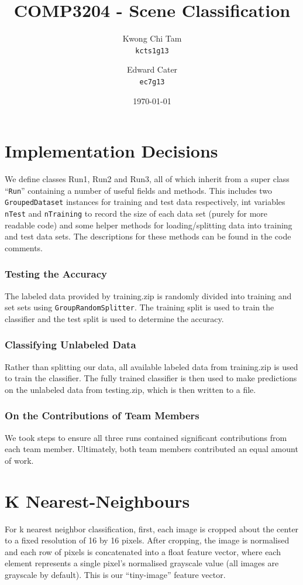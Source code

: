 \documentclass[a4paper]{article}
\title{COMP3204 - Scene Classification}
\author{
	Kwong Chi Tam\\
 	\texttt{kcts1g13}
    \and
  	Edward Cater\\
  	\texttt{ec7g13}  
}
\date{\today}
\begin{document}
\maketitle

\section*{Implementation Decisions}
We define classes Run1, Run2 and Run3, all of which inherit from a super class ``\texttt{Run}'' containing a number of useful fields and methods. This includes two  \texttt{GroupedDataset} instances for training and test data respectively, int variables \texttt{nTest} and \texttt{nTraining} to record the size of each data set (purely for more readable code) and some helper methods for loading/splitting data into training and test data sets. The descriptions for these methods can be found in the code comments.

\subsubsection*{Testing the Accuracy}
The labeled data provided by training.zip is randomly divided into training and set sets using \texttt{GroupRandomSplitter}. The training split is used to train the classifier and the test split is used to determine the accuracy.

\subsubsection*{Classifying Unlabeled Data}
Rather than splitting our data, all available labeled data from training.zip is used to train the classifier. The fully trained classifier is then used to make predictions on the unlabeled data from testing.zip, which is then written to a file.

\subsubsection*{On the Contributions of Team Members}
We took steps to ensure all three runs contained significant contributions from each team member. Ultimately, both team members contributed an equal amount of work.

\section{K Nearest-Neighbours}
For k nearest neighbor classification, first, each image is cropped about the center to a fixed resolution of 16 by 16 pixels. After cropping, the image is normalised and each row of pixels is concatenated into a float feature vector, where each element represents a single pixel’s normalised grayscale value (all images are grayscale by default). This is our “tiny-image” feature vector.
\end{document}
